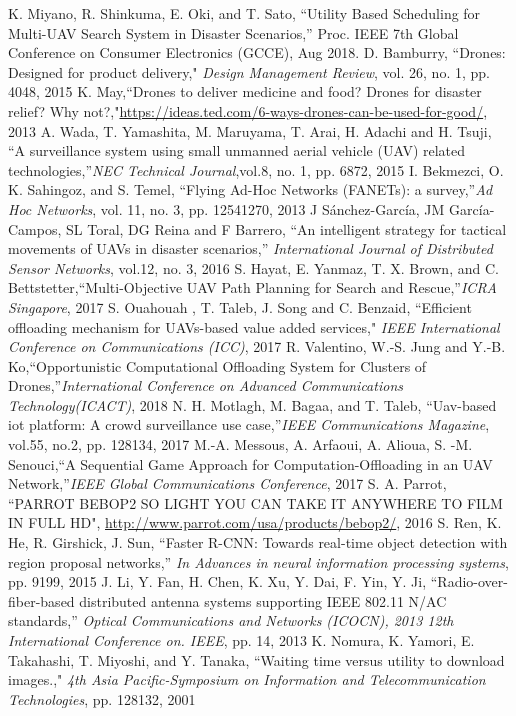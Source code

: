 \documentclass{ieeeaccess}
\begin{document}
\begin{thebibliography}{1}
%
  K. Miyano, R. Shinkuma, E. Oki, and T. Sato, ``Utility Based Scheduling for Multi-UAV Search System in Disaster Scenarios,'' Proc. IEEE 7th Global Conference on Consumer Electronics (GCCE), Aug 2018.
 D. Bamburry, ``Drones: Designed for product delivery," \emph{Design Management Review}, vol. 26, no. 1, pp. 4048, 2015
 K. May,``Drones to deliver medicine and food? Drones for disaster relief? Why not?,"\url{https://ideas.ted.com/6-ways-drones-can-be-used-for-good/}, 2013
 A. Wada, T. Yamashita, M. Maruyama, T. Arai, H. Adachi and H. Tsuji, ``A surveillance system using small unmanned aerial vehicle (UAV) related technologies,''\emph{NEC Technical Journal},vol.8, no. 1, pp. 6872, 2015
 I. Bekmezci, O. K. Sahingoz, and S. Temel, ``Flying Ad-Hoc Networks (FANETs): a survey,''\emph{Ad Hoc Networks}, vol. 11, no. 3, pp. 12541270, 2013
 J S\'anchez-Garc\'ia, JM Garc\'ia-Campos, SL Toral, DG Reina and F Barrero, ``An intelligent strategy for tactical movements of UAVs in disaster scenarios,''\emph{
International Journal of Distributed Sensor Networks}, vol.12, no. 3, 2016
 S. Hayat, E. Yanmaz, T. X. Brown, and C. Bettstetter,``Multi-Objective UAV Path Planning for Search and Rescue,''\emph{ICRA Singapore}, 2017 
%
S. Ouahouah , T. Taleb, J. Song and C. Benzaid, ``Efficient offloading mechanism for UAVs-based value added services," \emph{IEEE International Conference on Communications (ICC)}, 2017
 R. Valentino, W.-S. Jung and Y.-B. Ko,``Opportunistic Computational Offloading System for Clusters of Drones,''\emph{International Conference on Advanced Communications Technology(ICACT)}, 2018 
%
N. H. Motlagh, M. Bagaa, and T. Taleb, ``Uav-based iot platform: A crowd surveillance use case,''\emph{IEEE Communications Magazine}, vol.55, no.2, pp. 128134, 2017
%
 M.-A. Messous, A. Arfaoui, A. Alioua, S. -M. Senouci,``A Sequential Game Approach for Computation-Offloading in an UAV Network,''\emph{IEEE Global Communications Conference}, 2017 
 S. A. Parrot, ``PARROT BEBOP2 SO LIGHT YOU CAN TAKE IT ANYWHERE TO FILM IN FULL HD", \url{http://www.parrot.com/usa/products/bebop2/}, 2016
%
 S. Ren, K. He, R. Girshick, J. Sun, ``Faster R-CNN: Towards
real-time object detection with region proposal networks,'' \emph{In Advances in neural information processing systems}, pp. 9199, 2015
 J. Li, Y. Fan, H. Chen, K. Xu, Y. Dai, F. Yin, Y. Ji,  ``Radio-over-fiber-based distributed antenna systems supporting IEEE 802.11 N/AC standards,'' \emph{Optical Communications and Networks (ICOCN), 2013 12th International Conference on. IEEE}, pp. 14, 2013
K. Nomura, K. Yamori, E. Takahashi, T. Miyoshi, and Y. Tanaka, ``Waiting time versus utility to download images.," \emph{4th Asia Pacific-Symposium on Information and Telecommunication Technologies}, pp. 128132, 2001

\end{thebibliography}
\end{document}

